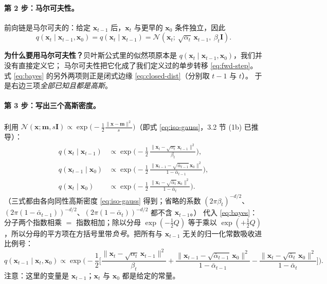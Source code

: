 \documentclass[a4paper,fontset=none,zihao=5]{ctexart}
\numberwithin{equation}{section}
\newcommand{\x}{\mathbf{x}}
\newcommand{\I}{\mathbf{I}}
\newcommand{\N}{\mathcal{N}}
\newcommand{\abar}{\bar{\alpha}}
\begin{document}
\paragraph{第 2 步：马尔可夫性。}前向链是马尔可夫的：给定 $\x_{t-1}$ 后，$\x_t$ 与更早的 $\x_0$ 条件独立，因此
\begin{equation}
  q(\x_t\mid\x_{t-1},\x_0)=q(\x_t\mid\x_{t-1})=\N\!\left(\x_t;\ \sqrt{\alpha_t}\,\x_{t-1},\ \beta_t\I\right).
  \label{eq:markov}
\end{equation}
\begin{whybox}
\textbf{为什么要用马尔可夫性？}贝叶斯公式里的似然项原本是 $q(\x_t\mid\x_{t-1},\x_0)$，我们并没有直接定义它；
马尔可夫性把它化成了我们定义过的单步转移 \eqref{eq:fwd-step}。式 \eqref{eq:bayes} 的另外两项则正是闭式边缘 \eqref{eq:closed-dist}（分别取 $t-1$ 与 $t$）。
于是右边三项\emph{全部已知且都是高斯}。
\end{whybox}

\paragraph{第 3 步：写出三个高斯密度。}利用 $\N(\x;\mathbf{m},s\I)\propto\exp\!\big(-\frac{1}{2}\frac{\|\x-\mathbf{m}\|^2}{s}\big)$（即式 \eqref{eq:iso-gauss}，3.2 节 (1b) 已推导）：
\begin{align}
  q(\x_t\mid\x_{t-1}) &\propto \exp\!\Big(-\frac12\,\frac{\|\x_t-\sqrt{\alpha_t}\,\x_{t-1}\|^2}{\beta_t}\Big), \\
  q(\x_{t-1}\mid\x_0) &\propto \exp\!\Big(-\frac12\,\frac{\|\x_{t-1}-\sqrt{\abar_{t-1}}\,\x_0\|^2}{1-\abar_{t-1}}\Big), \\
  q(\x_t\mid\x_0) &\propto \exp\!\Big(-\frac12\,\frac{\|\x_t-\sqrt{\abar_t}\,\x_0\|^2}{1-\abar_t}\Big).
\end{align}
（三式都由各向同性高斯密度 \eqref{eq:iso-gauss} 得到；省略的系数 $(2\pi\beta_t)^{-d/2}$、$(2\pi(1-\abar_{t-1}))^{-d/2}$、$(2\pi(1-\abar_t))^{-d/2}$ 都不含 $\x_{t-1}$。）
代入 \eqref{eq:bayes}：分子两个指数相乘 $=$ 指数相加；除以分母 $\exp(-\frac12 Q)$ 等于乘以 $\exp(+\frac12 Q)$，所以分母的平方项在方括号里带\emph{负号}。把所有与 $\x_{t-1}$ 无关的归一化常数吸收进比例号：
\begin{equation}
  q(\x_{t-1}\mid\x_t,\x_0)\propto
  \exp\!\Big(-\frac12\Big[
    \frac{\|\x_t-\sqrt{\alpha_t}\,\x_{t-1}\|^2}{\beta_t}
   +\frac{\|\x_{t-1}-\sqrt{\abar_{t-1}}\,\x_0\|^2}{1-\abar_{t-1}}
   -\frac{\|\x_t-\sqrt{\abar_t}\,\x_0\|^2}{1-\abar_t}
  \Big]\Big).
  \label{eq:post-exp}
\end{equation}
注意：这里的变量是 $\x_{t-1}$；$\x_t$ 与 $\x_0$ 都是给定的常量。
\end{document}
